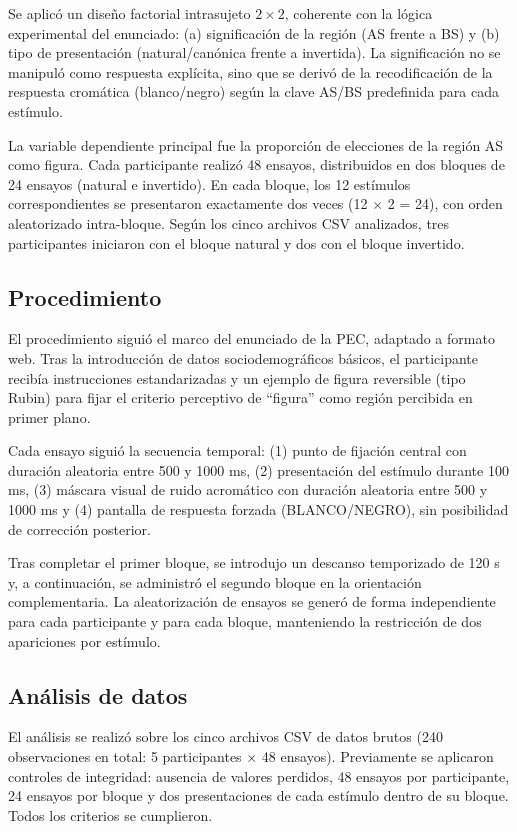 \documentclass[stu, 12pt, letterpaper, donotrepeattitle, floatsintext, natbib]{apa7}
\begin{document}
Se aplicó un diseño factorial intrasujeto \(2 \times 2\), coherente con la lógica experimental del enunciado: (a) significación de la región (AS frente a BS) y (b) tipo de presentación (natural/canónica frente a invertida). La significación no se manipuló como respuesta explícita, sino que se derivó de la recodificación de la respuesta cromática (blanco/negro) según la clave AS/BS predefinida para cada estímulo.

La variable dependiente principal fue la proporción de elecciones de la región AS como figura. Cada participante realizó 48 ensayos, distribuidos en dos bloques de 24 ensayos (natural e invertido). En cada bloque, los 12 estímulos correspondientes se presentaron exactamente dos veces (12 \(\times\) 2 = 24), con orden aleatorizado intra-bloque. Según los cinco archivos CSV analizados, tres participantes iniciaron con el bloque natural y dos con el bloque invertido.

\subsection{Procedimiento}

El procedimiento siguió el marco del enunciado de la PEC, adaptado a formato web. Tras la introducción de datos sociodemográficos básicos, el participante recibía instrucciones estandarizadas y un ejemplo de figura reversible (tipo Rubin) para fijar el criterio perceptivo de ``figura'' como región percibida en primer plano.

Cada ensayo siguió la secuencia temporal: (1) punto de fijación central con duración aleatoria entre 500 y 1000 ms, (2) presentación del estímulo durante 100 ms, (3) máscara visual de ruido acromático con duración aleatoria entre 500 y 1000 ms y (4) pantalla de respuesta forzada (BLANCO/NEGRO), sin posibilidad de corrección posterior. 

Tras completar el primer bloque, se introdujo un descanso temporizado de 120 s y, a continuación, se administró el segundo bloque en la orientación complementaria. La aleatorización de ensayos se generó de forma independiente para cada participante y para cada bloque, manteniendo la restricción de dos apariciones por estímulo.

\subsection{Análisis de datos}

El análisis se realizó sobre los cinco archivos CSV de datos brutos (240 observaciones en total: 5 participantes \(\times\) 48 ensayos). Previamente se aplicaron controles de integridad: ausencia de valores perdidos, 48 ensayos por participante, 24 ensayos por bloque y dos presentaciones de cada estímulo dentro de su bloque. Todos los criterios se cumplieron.
\end{document}
